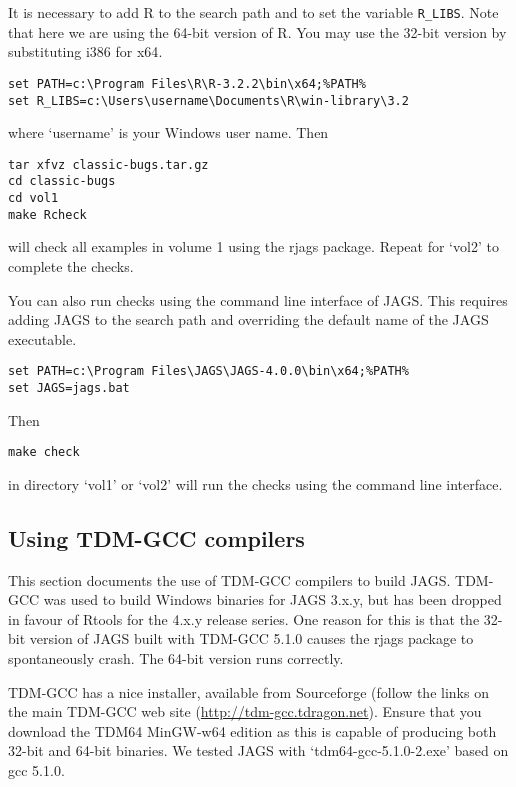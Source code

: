 \documentclass[11pt, a4paper, titlepage]{article}
\newcommand{\JAGS}{\textsf{JAGS}}
\newcommand{\R}{\textsf{R}}
\newcommand{\code}[1]{{\bgroup{\normalfont\ttfamily #1}\egroup}}
\newcommand{\file}[1]{{`\normalfont\textsf{#1}'}}
\begin{document}
It is necessary to add R to the search path and to set the variable
\verb+R_LIBS+. Note that here we are using the 64-bit version of R.
You may use the 32-bit version by substituting \code{i386} for
\code{x64}.
\begin{verbatim}
set PATH=c:\Program Files\R\R-3.2.2\bin\x64;%PATH%
set R_LIBS=c:\Users\username\Documents\R\win-library\3.2
\end{verbatim}
where \file{username} is your Windows user name. Then
\begin{verbatim}
tar xfvz classic-bugs.tar.gz
cd classic-bugs
cd vol1
make Rcheck
\end{verbatim}
will check all examples in volume 1 using the \code{rjags} package. Repeat
for \file{vol2} to complete the checks.

You can also run checks using the command line interface of JAGS. This
requires adding JAGS to the search path and overriding the default name
of the JAGS executable.
\begin{verbatim}
set PATH=c:\Program Files\JAGS\JAGS-4.0.0\bin\x64;%PATH%
set JAGS=jags.bat
\end{verbatim}
Then
\begin{verbatim}
make check
\end{verbatim}
in directory \file{vol1} or \file{vol2} will run the checks using the
command line interface.

\subsection{Using TDM-GCC compilers}

This section documents the use of TDM-GCC compilers to build JAGS.
TDM-GCC was used to build Windows binaries for JAGS 3.x.y, but has
been dropped in favour of Rtools for the 4.x.y release series. One
reason for this is that the 32-bit version of JAGS built with TDM-GCC
5.1.0 causes the rjags package to spontaneously crash. The 64-bit
version runs correctly.

TDM-GCC has a nice installer, available from Sourceforge (follow the
links on the main TDM-GCC web site
(\url{http://tdm-gcc.tdragon.net}). Ensure that you download the TDM64
MinGW-w64 edition as this is capable of producing both 32-bit and
64-bit binaries. We tested JAGS with \file{tdm64-gcc-5.1.0-2.exe}
based on gcc 5.1.0.
\end{document}
